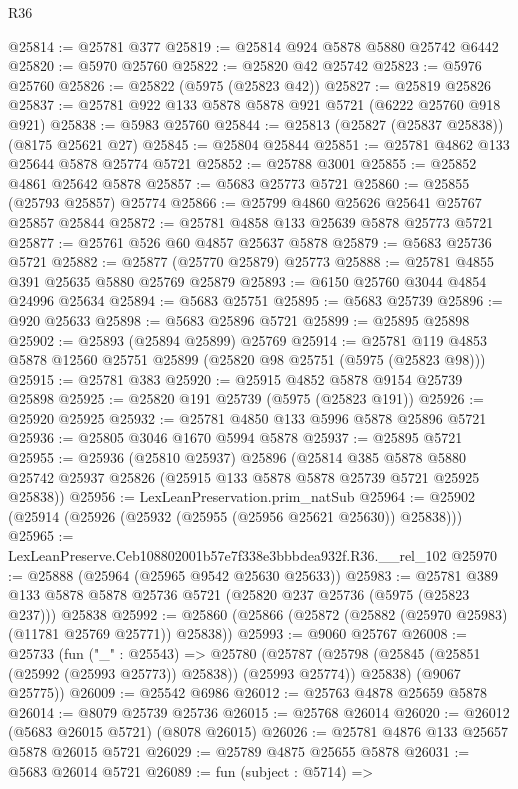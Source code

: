 \begin{lexlean}{R36}
\begin{coremodule}
@25814 := @25781 @377
@25819 := @25814 @924 @5878 @5880 @25742 @6442
@25820 := @5970 @25760
@25822 := @25820 @42 @25742
@25823 := @5976 @25760
@25826 := @25822 (@5975 (@25823 @42))
@25827 := @25819 @25826
@25837 := @25781 @922 @133 @5878 @5878 @921 @5721 (@6222 @25760 @918 @921)
@25838 := @5983 @25760
@25844 := @25813 (@25827 (@25837 @25838)) (@8175 @25621 @27)
@25845 := @25804 @25844
@25851 := @25781 @4862 @133 @25644 @5878 @25774 @5721
@25852 := @25788 @3001
@25855 := @25852 @4861 @25642 @5878
@25857 := @5683 @25773 @5721
@25860 := @25855 (@25793 @25857) @25774
@25866 := @25799 @4860 @25626 @25641 @25767 @25857 @25844
@25872 := @25781 @4858 @133 @25639 @5878 @25773 @5721
@25877 := @25761 @526 @60 @4857 @25637 @5878
@25879 := @5683 @25736 @5721
@25882 := @25877 (@25770 @25879) @25773
@25888 := @25781 @4855 @391 @25635 @5880 @25769 @25879
@25893 := @6150 @25760 @3044 @4854 @24996 @25634
@25894 := @5683 @25751
@25895 := @5683 @25739
@25896 := @920 @25633
@25898 := @5683 @25896 @5721
@25899 := @25895 @25898
@25902 := @25893 (@25894 @25899) @25769
@25914 := @25781 @119 @4853 @5878 @12560 @25751 @25899 (@25820 @98 @25751 (@5975 (@25823 @98)))
@25915 := @25781 @383
@25920 := @25915 @4852 @5878 @9154 @25739 @25898
@25925 := @25820 @191 @25739 (@5975 (@25823 @191))
@25926 := @25920 @25925
@25932 := @25781 @4850 @133 @5996 @5878 @25896 @5721
@25936 := @25805 @3046 @1670 @5994 @5878
@25937 := @25895 @5721
@25955 := @25936
    (@25810 @25937)
    @25896
    (@25814
      @385
      @5878
      @5880
      @25742
      @25937
      @25826
      (@25915 @133 @5878 @5878 @25739 @5721 @25925 @25838))
@25956 := LexLeanPreservation.prim_natSub
@25964 := @25902 (@25914 (@25926 (@25932 (@25955 (@25956 @25621 @25630)) @25838)))
@25965 := LexLeanPreserve.Ceb108802001b57e7f338e3bbbdea932f.R36.__rel_102
@25970 := @25888 (@25964 (@25965 @9542 @25630 @25633))
@25983 := @25781
    @389
    @133
    @5878
    @5878
    @25736
    @5721
    (@25820 @237 @25736 (@5975 (@25823 @237)))
    @25838
@25992 := @25860 (@25866 (@25872 (@25882 (@25970 @25983) (@11781 @25769 @25771)) @25838))
@25993 := @9060 @25767
@26008 := @25733
    (fun ("_" : @25543) =>
    @25780
      (@25787 (@25798 (@25845 (@25851 (@25992 (@25993 @25773)) @25838)) (@25993 @25774)) @25838)
      (@9067 @25775))
@26009 := @25542 @6986
@26012 := @25763 @4878 @25659 @5878
@26014 := @8079 @25739 @25736
@26015 := @25768 @26014
@26020 := @26012 (@5683 @26015 @5721) (@8078 @26015)
@26026 := @25781 @4876 @133 @25657 @5878 @26015 @5721
@26029 := @25789 @4875 @25655 @5878
@26031 := @5683 @26014 @5721
@26089 := fun (subject : @5714) =>

\end{coremodule}
\end{lexlean}

